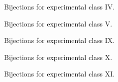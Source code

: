 \begin{figure}[ht!]
    \centering
    
    \caption{Bijections for experimental class IV.}
    \label{fig:expgrp_IV}
\end{figure}


\begin{figure}[ht!]
    \centering
    
    \caption{Bijections for experimental class V.}
    \label{fig:expgrp_V}
\end{figure}


\begin{comment}
\begin{figure}[ht!]
    \centering
    
    \caption{Bijections for experimental class VI.}
    \label{fig:expgrp_VI}
\end{figure}
\end{comment}


\begin{comment}
\begin{figure}[ht!]
    \centering
    
    \caption{Bijections for experimental class VII.}
    \label{fig:expgrp_VII}
\end{figure}
\end{comment}


\begin{comment}
\begin{figure}[ht!]
    \centering
    
    \caption{Bijections for experimental class VIII.}
    \label{fig:expgrp_VIII}
\end{figure}
\end{comment}


\begin{figure}[ht!]
    \centering
    
    \caption{Bijections for experimental class IX.}
    \label{fig:expgrp_IX}
\end{figure}


\begin{figure}[ht!]
    \centering
    
    \caption{Bijections for experimental class X.}
    \label{fig:expgrp_X}
\end{figure}


\begin{figure}[ht!]
    \centering
    
    \caption{Bijections for experimental class XI.}
    \label{fig:expgrp_XI}
\end{figure}


